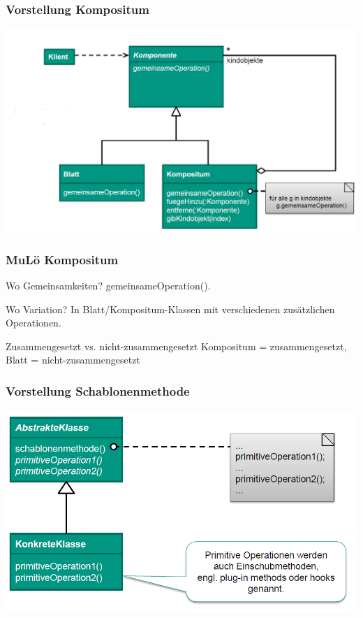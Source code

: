 \documentclass[18pt]{beamer}
\begin{document}
	\begin{frame}
		\frametitle{Vorstellung Kompositum}
		\includegraphics[scale=0.35]{./pics/tut4/comp.png}
	\end{frame}

	\begin{frame}
		\frametitle{MuLö Kompositum}
		\begin{block}{Wo Gemeinsamkeiten?}
			gemeinsameOperation().
		\end{block}
		\begin{block}{Wo Variation?}
			In Blatt/Kompositum-Klassen mit verschiedenen zusätzlichen Operationen.
		\end{block}
		\begin{block}{Zusammengesetzt vs. nicht-zusammengesetzt}
			Kompositum = zusammengesetzt, Blatt = nicht-zusammengesetzt
		\end{block}
	\end{frame}

	\begin{frame}
		\frametitle{Vorstellung Schablonenmethode}
		\includegraphics[scale=0.45]{./pics/tut4/schab.png}
	\end{frame}
\end{document}
